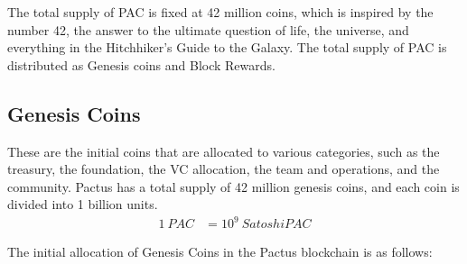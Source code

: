 \documentclass{novel}
\begin{document}
The total supply of PAC is fixed at 42 million coins, which is inspired by the number 42, the answer to the ultimate question of life, the universe, and everything in the Hitchhiker's Guide to the Galaxy. The total supply of PAC is distributed as Genesis coins and Block Rewards.

\subsection{Genesis Coins} These are the initial coins that are allocated to various categories, such as the treasury, the foundation, the VC allocation, the team and operations, and the community.
Pactus has a total supply of 42 million genesis coins, and each coin is divided into 1 billion units.
\begin{align}\nonumber
  1 \  PAC &= 10^9 \  SatoshiPAC
\end{align}

The initial allocation of Genesis Coins in the Pactus blockchain is as follows:
\end{document}

